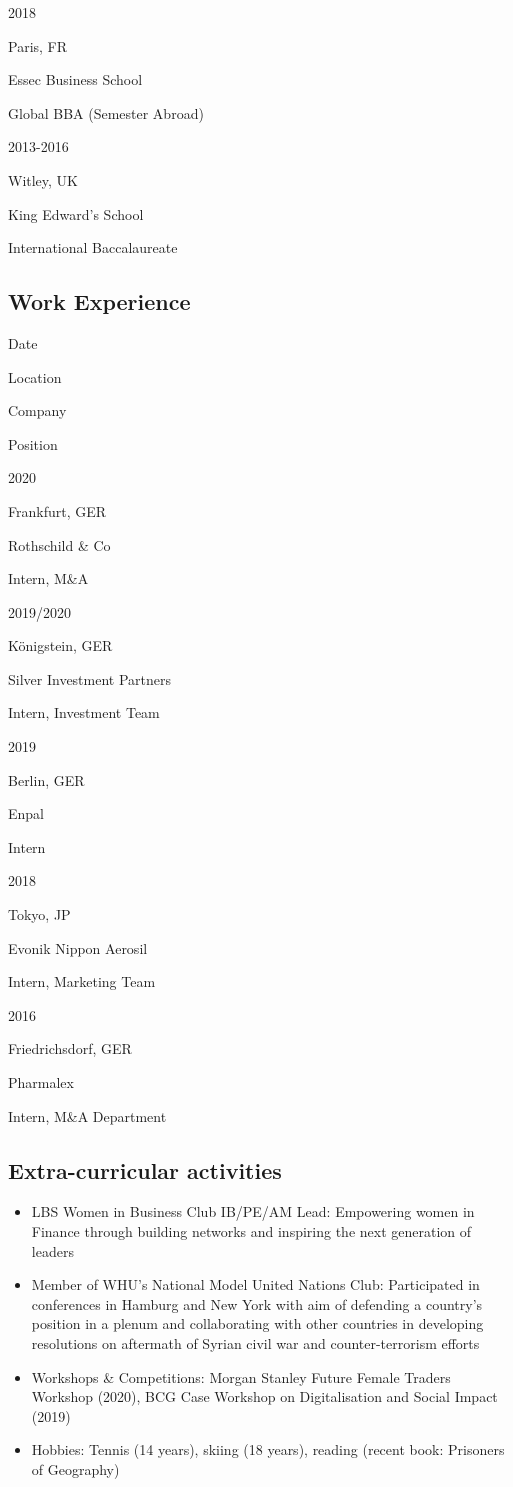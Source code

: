 \documentclass[11pt, a4paper]{awesome-cv}
\providecommand{\tightlist}{%
	\setlength{\itemsep}{0pt}\setlength{\parskip}{0pt}}
\begin{document}
2018

Paris, FR

Essec Business School

Global BBA (Semester Abroad)

2013-2016

Witley, UK

King Edward's School

International Baccalaureate

\hypertarget{work-experience}{%
\subsection{Work Experience}\label{work-experience}}

Date

Location

Company

Position

2020

Frankfurt, GER

Rothschild \& Co

Intern, M\&A

2019/2020

Königstein, GER

Silver Investment Partners

Intern, Investment Team

2019

Berlin, GER

Enpal

Intern

2018

Tokyo, JP

Evonik Nippon Aerosil

Intern, Marketing Team

2016

Friedrichsdorf, GER

Pharmalex

Intern, M\&A Department

\hypertarget{extra-curricular-activities}{%
\subsection{Extra-curricular activities}\label{extra-curricular-activities}}

\begin{itemize}
\tightlist
\item
  LBS Women in Business Club IB/PE/AM Lead: Empowering women in Finance through building networks and inspiring the next generation of leaders
\item
  Member of WHU's National Model United Nations Club: Participated in conferences in Hamburg and New York with aim of defending a country's position in a plenum and collaborating with other countries in developing resolutions on aftermath of Syrian civil war and counter-terrorism efforts
\item
  Workshops \& Competitions: Morgan Stanley Future Female Traders Workshop (2020), BCG Case Workshop on Digitalisation and Social Impact (2019)
\item
  Hobbies: Tennis (14 years), skiing (18 years), reading (recent book: Prisoners of Geography)
\end{itemize}
\end{document}
